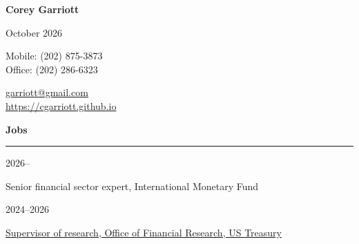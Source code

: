 \documentclass[11pt,letterpaper]{article}
\begin{document}

\begin{center}
\textbf{Corey Garriott}

October 2026
\end{center}

\begin{center}
\begin{minipage}[ht]{0.3\textwidth}
\begin{flushright}
Mobile: (202) 875-3873 \\
Office: (202) 286-6323
\end{flushright}
\end{minipage}
\begin{minipage}[ht]{0.05\textwidth}
\hspace{0.2cm}
\end{minipage}
\begin{minipage}[ht]{0.3\textwidth}
\href{mailto:corey.garriott@tmx.com}{garriott@gmail.com} \\
\href{https://cgarriott.github.io}{https://cgarriott.github.io}
\end{minipage}
\end{center}




\bigskip
\noindent \textbf{Jobs}
\smallskip
\hrule

\medskip

\noindent
\begin{minipage}[t]{0.15\textwidth}
2026--
\end{minipage}
\begin{minipage}[t]{0.80\textwidth}
Senior financial sector expert, International Monetary Fund

\end{minipage}

\smallskip

\noindent
\begin{minipage}[t]{0.15\textwidth}
2024--2026
\end{minipage}
\begin{minipage}[t]{0.80\textwidth}
\href{https://www.financialresearch.gov}{Supervisor of research, Office of Financial Research, US Treasury}

\end{minipage}
\end{document}
